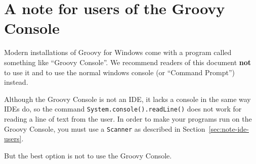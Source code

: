 \section{A note for users of the Groovy Console}
\label{sec:note-ide-console-groovy-users}

Modern installations of Groovy for Windows come with a program called
something like ``Groovy Console''. We recommend readers of this
document \textbf{not} to use it and to use the normal windows console (or
``Command Prompt'') instead. 

Although the Groovy Console is not an IDE, it lacks a console in
the same way IDEs do, so the command
\verb+System.console().readLine()+ does not work for reading a line of
text from the user. In order to make your programs run on the Groovy
Console, you must use a \verb+Scanner+ as described in
Section~\ref{sec:note-ide-users}. 

But the best option is not to use the Groovy Console. 


